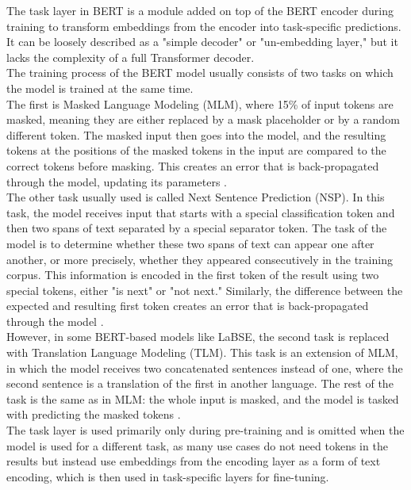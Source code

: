 The task layer in BERT is a module added on top of the BERT encoder during training to transform embeddings from the encoder into task-specific predictions. It can be loosely described as a "simple decoder" or "un-embedding layer," but it lacks the complexity of a full Transformer decoder.
\\

The training process of the BERT model usually consists of two tasks on which the model is trained at the same time. 
\\

The first is Masked Language Modeling (MLM), where 15\% of input tokens are masked, meaning they are either replaced by a mask placeholder or by a random different token. The masked input then goes into the model, and the resulting tokens at the positions of the masked tokens in the input are compared to the correct tokens before masking. This creates an error that is back-propagated through the model, updating its parameters \cite{bert_pretr_1}. 
\\

The other task usually used is called Next Sentence Prediction (NSP). In this task, the model receives input that starts with a special classification token and then two spans of text separated by a special separator token. The task of the model is to determine whether these two spans of text can appear one after another, or more precisely, whether they appeared consecutively in the training corpus. This information is encoded in the first token of the result using two special tokens, either "is next" or "not next." Similarly, the difference between the expected and resulting first token creates an error that is back-propagated through the model \cite{bert_pretr_2}.
\\

However, in some BERT-based models like LaBSE, the second task is replaced with Translation Language Modeling (TLM). This task is an extension of MLM, in which the model receives two concatenated sentences instead of one, where the second sentence is a translation of the first in another language. The rest of the task is the same as in MLM: the whole input is masked, and the model is tasked with predicting the masked tokens \cite{bert_pretr_3}. 
\\

The task layer is used primarily only during pre-training and is omitted when the model is used for a different task, as many use cases do not need tokens in the results but instead use embeddings from the encoding layer as a form of text encoding, which is then used in task-specific layers for fine-tuning.


